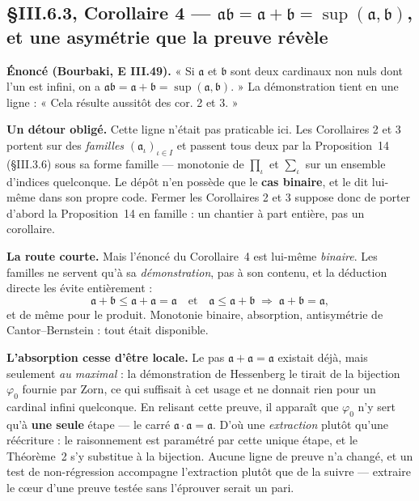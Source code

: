 \subsection{§III.6.3, Corollaire 4 --- $\mathfrak{ab} = \mathfrak{a}+\mathfrak{b}
= \sup(\mathfrak{a},\mathfrak{b})$, et une asymétrie que la preuve révèle}
\label{sec:iii6-cor4}

\textbf{Énoncé (Bourbaki, E III.49).} « Si $\mathfrak{a}$ et $\mathfrak{b}$ sont
deux cardinaux non nuls dont l'un est infini, on a
$\mathfrak{ab} = \mathfrak{a}+\mathfrak{b} = \sup(\mathfrak{a},\mathfrak{b})$. »
La démonstration tient en une ligne : « Cela résulte aussitôt des cor. 2 et 3. »

\textbf{Un détour obligé.} Cette ligne n'était pas praticable ici. Les
Corollaires 2 et 3 portent sur des \emph{familles} $(\mathfrak{a}_\iota)_{\iota
\in I}$ et passent tous deux par la Proposition~14 (§III.3.6) sous sa forme
famille --- monotonie de $\prod_\iota$ et $\sum_\iota$ sur un ensemble d'indices
quelconque. Le dépôt n'en possède que le \textbf{cas binaire}, et le dit
lui-même dans son propre code. Fermer les Corollaires 2 et 3 suppose donc de
porter d'abord la Proposition~14 en famille : un chantier à part entière, pas un
corollaire.

\textbf{La route courte.} Mais l'énoncé du Corollaire~4 est lui-même
\emph{binaire}. Les familles ne servent qu'à sa \emph{démonstration}, pas à son
contenu, et la déduction directe les évite entièrement :
\[
\mathfrak{a}+\mathfrak{b} \le \mathfrak{a}+\mathfrak{a}
= \mathfrak{a} \quad\text{et}\quad \mathfrak{a} \le \mathfrak{a}+\mathfrak{b}
\;\Longrightarrow\; \mathfrak{a}+\mathfrak{b} = \mathfrak{a} ,
\]
et de même pour le produit. Monotonie binaire, absorption, antisymétrie de
Cantor--Bernstein : tout était disponible.

\textbf{L'absorption cesse d'être locale.} Le pas $\mathfrak{a}+\mathfrak{a} =
\mathfrak{a}$ existait déjà, mais seulement \emph{au maximal} : la démonstration
de Hessenberg le tirait de la bijection $\varphi_0$ fournie par Zorn, ce qui
suffisait à cet usage et ne donnait rien pour un cardinal infini quelconque. En
relisant cette preuve, il apparaît que $\varphi_0$ n'y sert qu'à \textbf{une
seule} étape --- le carré $\mathfrak{a}\cdot\mathfrak{a} = \mathfrak{a}$. D'où
une \emph{extraction} plutôt qu'une réécriture : le raisonnement est paramétré
par cette unique étape, et le Théorème~2 s'y substitue à la bijection. Aucune
ligne de preuve n'a changé, et un test de non-régression accompagne l'extraction
plutôt que de la suivre --- extraire le c\oe{}ur d'une preuve testée sans
l'éprouver serait un pari.

